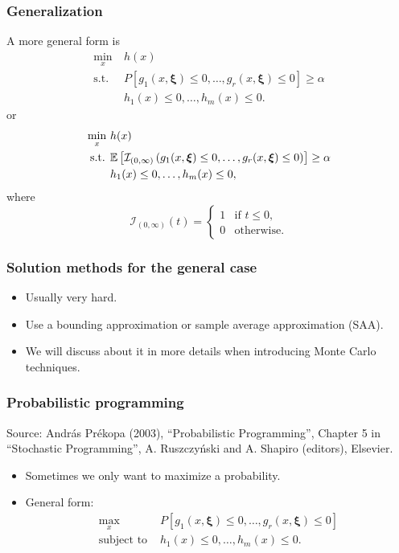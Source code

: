 \documentclass{beamer}
\def\bxi{\boldsymbol\xi}
\begin{document}
\begin{frame}
\frametitle{Generalization}

A more general form is
\begin{align*}
	\min_x \ & h(x) \\
	\text{s.t. } & P[ g_1(x, \bxi) \leq 0,\ldots, g_r(x, \bxi) \leq 0] \geq \alpha \\
	& h_1(x) \leq 0,\ldots, h_m(x) \leq 0.
\end{align*}
or
\begin{align*}
	\min_x \ & h(x) \\
	\text{s.t. } & \EE\left[ \mathcal{I}_{(0,\infty)} \left( g_1(x, \bxi) \leq 0,\ldots, g_r(x, \bxi) \leq 0 \right) \right] \geq \alpha \\
	& h_1(x) \leq 0,\ldots, h_m(x) \leq 0,
\end{align*}
where
$$
\mathcal{I}_{(0,\infty)}(t) =
\begin{cases}
	1 & \mbox{if } t \leq 0,\\
	0 & \mbox{otherwise}.
\end{cases}
$$

\end{frame}

\begin{frame}
\frametitle{Solution methods for the general case}

\begin{itemize}
\item	
Usually very hard.
\item
Use a bounding approximation or sample average approximation (SAA).
\item
We will discuss about it in more details when introducing Monte Carlo techniques.
\end{itemize}

\end{frame}

\begin{frame}
\frametitle{Probabilistic programming}

Source: András Prékopa (2003), ``Probabilistic Programming'', Chapter 5 in ``Stochastic Programming'', A. Ruszczy\'nski and A. Shapiro (editors), Elsevier.

\mbox{}

\begin{itemize}
	\item 
Sometimes we only want to maximize a probability.
\item
General form:
\begin{align*}
\max_x \ & P[ g_1(x, \bxi) \leq 0,\ldots, g_r(x, \bxi) \leq 0] \\
\text{subject to } & h_1(x) \leq 0,\ldots, h_m(x) \leq 0.
\end{align*}
\end{itemize}

\end{frame}
\end{document}
